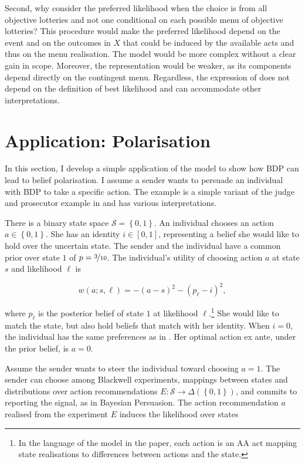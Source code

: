 Second, why consider the preferred likelihood when the choice is from all objective lotteries and not one conditional on each possible menu of objective lotteries? This procedure would make the preferred likelihood depend on the event and on the outcomes in \( X \) that could be induced by the available acts and thus on the menu realisation. The model would be more complex without a clear gain in scope. Moreover, the representation would be weaker, as its components depend directly on the contingent menu. Regardless, the expression of  does not depend on the definition of best likelihood and can accommodate other interpretations.

\section{Application: Polarisation}\label{sec:application}

In this section, I develop a simple application of the model to show how BDP can lead to belief polarisation. I assume a sender wants to persuade an individual with BDP to take a specific action. The example is a simple variant of the judge and prosecutor example in \cite{kamenicaBayesianPersuasion2011} and has various interpretations.

There is a binary state space \( \mathcal{S} = \left\{ 0, 1 \right\} \). An individual chooses an action \( a \in \left\{ 0, 1 \right\} \). She has an identity \( i \in \left[ 0, 1 \right] \), representing a belief she would like to hold over the uncertain state. The sender and the individual have a common prior over state \( 1 \) of \( p = \nicefrac{3}{10} \). The individual's utility of choosing action \( a \) at state \( s \) and likelihood \( \ell \) is

\[
	w \left( a ; s, \ell \right) = - \left( a - s \right)^2 - \left( p_{\ell} - i \right)^2 ,
\]

where \( p_{\ell} \) is the posterior belief of state \( 1 \) at likelihood \( \ell \).\footnote{In the language of the model in the paper, each action is an AA act mapping state realisations to differences between actions and the state.} She would like to match the state, but also hold beliefs that match with her identity. When \( i = 0 \), the individual has the same preferences as in \cite{kamenicaBayesianPersuasion2011}. Her optimal action ex ante, under the prior belief, is \( a = 0 \).

Assume the sender wants to steer the individual toward choosing \( a = 1 \). The sender can choose among Blackwell experiments, mappings between states and distributions over action recommendations \( E : \mathcal{S} \rightarrow \Delta \left( \left\{0,1 \right\} \right) \), and commits to reporting the signal, as in Bayesian Persuasion. The action recommendation \( a \) realised from the experiment \( E \) induces the likelihood over states

